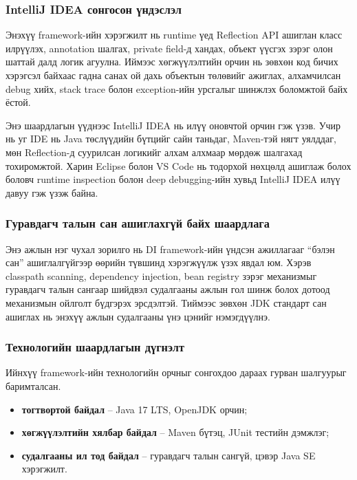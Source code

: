 \subsubsection{IntelliJ IDEA сонгосон үндэслэл}

Энэхүү framework-ийн хэрэгжилт нь runtime үед Reflection API ашиглан класс илрүүлэх, annotation шалгах, private field-д хандах, объект үүсгэх зэрэг олон шаттай далд логик агуулна. Иймээс хөгжүүлэлтийн орчин нь зөвхөн код бичих хэрэгсэл байхаас гадна санах ой дахь объектын төлөвийг ажиглах, алхамчилсан debug хийх, stack trace болон exception-ийн урсгалыг шинжлэх боломжтой байх ёстой.

Энэ шаардлагын үүднээс IntelliJ IDEA нь илүү оновчтой орчин гэж үзэв. Учир нь уг IDE нь Java төслүүдийн бүтцийг сайн таньдаг, Maven-тэй нягт уялддаг, мөн Reflection-д суурилсан логикийг алхам алхмаар мөрдөж шалгахад тохиромжтой. Харин Eclipse болон VS Code нь тодорхой нөхцөлд ашиглаж болох боловч runtime inspection болон deep debugging-ийн хувьд IntelliJ IDEA илүү давуу гэж үзэж байна.

\subsubsection{Гуравдагч талын сан ашиглахгүй байх шаардлага}

Энэ ажлын нэг чухал зорилго нь DI framework-ийн үндсэн ажиллагааг ``бэлэн сан'' ашиглалгүйгээр өөрийн түвшинд хэрэгжүүлж үзэх явдал юм. Хэрэв classpath scanning, dependency injection, bean registry зэрэг механизмыг гуравдагч талын сангаар шийдвэл судалгааны ажлын гол шинж болох дотоод механизмын ойлголт бүдгэрэх эрсдэлтэй. Тиймээс зөвхөн JDK стандарт сан ашиглах нь энэхүү ажлын судалгааны үнэ цэнийг нэмэгдүүлнэ.

\subsubsection{Технологийн шаардлагын дүгнэлт}

Ийнхүү framework-ийн технологийн орчныг сонгохдоо дараах гурван шалгуурыг баримталсан.
\begin{itemize}
    \item \textbf{тогтвортой байдал} -- Java 17 LTS, OpenJDK орчин;
    \item \textbf{хөгжүүлэлтийн хялбар байдал} -- Maven бүтэц, JUnit тестийн дэмжлэг;
    \item \textbf{судалгааны ил тод байдал} -- гуравдагч талын сангүй, цэвэр Java SE хэрэгжилт.
\end{itemize}


